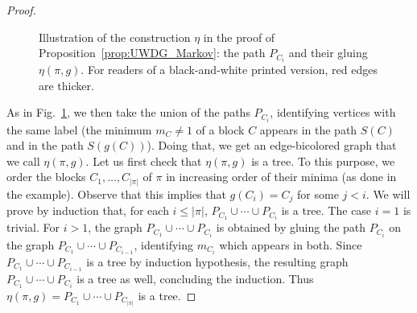 \documentclass[envcountsame]{svmult}
\begin{document}
\begin{proof}
\begin{figure}[ht]
\begin{center}
  \caption{Illustration of the construction $\eta$ in the proof of Proposition~\ref{prop:UWDG_Markov}:
  the path $P_{C_i}$ and their gluing $\eta(\pi,g)$. For readers of a black-and-white printed version,
  red edges are thicker.}
  \label{fig:example_eta}
  \end{center}
\end{figure}

As in Fig.~\ref{fig:example_eta},
we then take the union of the paths $P_{C_i}$, identifying vertices with the same label
(the minimum $m_C \ne 1$ of a block $C$ appears in the path $S(C)$ and in the path $S(g(C))$).
Doing that, we get an edge-bicolored graph that we call $\eta(\pi,g)$. Let us first check that $\eta(\pi,g)$ is a tree.
To this purpose, we order the blocks $C_1,\ldots, C_{|\pi|}$ of $\pi$
in increasing order of their minima (as done in the example).
Observe that this implies that $g(C_i)=C_j$ for some $j<i$.
We will prove by induction that, for each $i \le |\pi|$, $P_{C_1} \cup \cdots \cup P_{C_i}$ is a tree.
The case $i=1$ is trivial. For $i>1$, the graph $P_{C_1} \cup \cdots \cup P_{C_i}$
is obtained by gluing the path $P_{C_i}$ on the graph $P_{C_1} \cup \cdots \cup P_{C_{i-1}}$,
identifying $m_{C_i}$ which appears in both.
Since $P_{C_1} \cup \cdots \cup P_{C_{i-1}}$ is a tree by induction hypothesis,
the resulting graph $P_{C_1} \cup \cdots \cup P_{C_i}$ is a tree as well, concluding the induction.
Thus $\eta(\pi,g)= P_{C_1} \cup \cdots \cup P_{C_{|\pi|}}$ is a tree.\bigskip



\end{proof}
\end{document}
